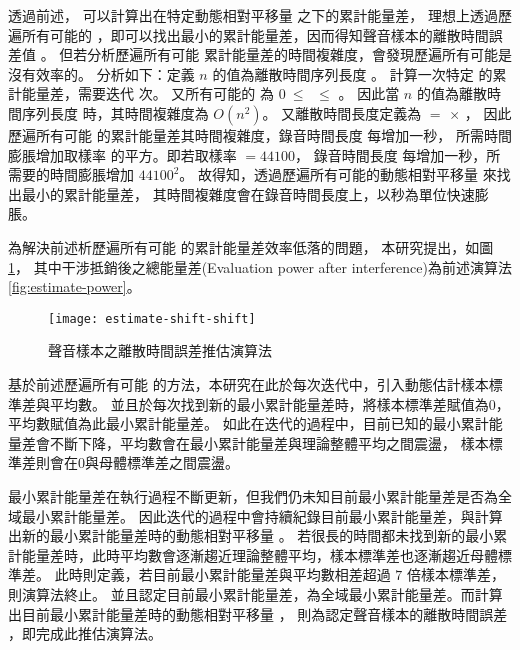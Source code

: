     透過前述，
可以計算出在特定動態相對平移量 \DEFcandiSFT 之下的累計能量差，
理想上透過歷遍所有可能的 \DEFcandiSFT，即可以找出最小的累計能量差，因而得知聲音樣本的離散時間誤差值 \DEFshift。
但若分析歷遍所有可能 \DEFcandiSFT 累計能量差的時間複雜度，會發現歷遍所有可能是沒有效率的。
分析如下：定義 $n$ 的值為離散時間序列長度 \DEFtimeLen。
計算一次特定 \DEFcandiSFT 的累計能量差，需要迭代 \DEFtimeLen 次。
又所有可能的 \DEFcandiSFT 為 $0 ~\leq$ \DEFcandiSFT $~\leq$ \DEFtimeLen。
因此當 $n$ 的值為離散時間序列長度 \DEFtimeLen 時，其時間複雜度為 $O(n^2)$。
又離散時間長度定義為 \DEFtimeLen $=$ \DEFsamplerate $\times$ \DEFtimeREC，
因此歷遍所有可能 \DEFcandiSFT 的累計能量差其時間複雜度，錄音時間長度 \DEFtimeREC 每增加一秒，
所需時間膨脹增加取樣率 \DEFsamplerate 的平方。即若取樣率 \DEFsamplerate $= 44100$，
錄音時間長度 \DEFtimeREC 每增加一秒，所需要的時間膨脹增加 $44100^2$。
故得知，透過歷遍所有可能的動態相對平移量 \DEFcandiSFT 來找出最小的累計能量差，
其時間複雜度會在錄音時間長度上，以秒為單位快速膨脹。

    為解決前述析歷遍所有可能 \DEFcandiSFT 的累計能量差效率低落的問題，
本研究提出，如圖 \ref{fig:estimate-shift}，
其中干涉抵銷後之總能量差(Evaluation power after interference)為前述演算法 \ref{fig:estimate-power}。

\begin{figure}[H]
    \centering
    \texttt{[image: estimate-shift-shift]}
    \caption{聲音樣本之離散時間誤差推估演算法}\label{fig:estimate-shift}
\end{figure}

    基於前述歷遍所有可能 \DEFcandiSFT 的方法，本研究在此於每次迭代中，引入動態估計樣本標準差與平均數。
並且於每次找到新的最小累計能量差時，將樣本標準差賦值為$0$，平均數賦值為此最小累計能量差。
如此在迭代的過程中，目前已知的最小累計能量差會不斷下降，平均數會在最小累計能量差與理論整體平均之間震盪，
樣本標準差則會在$0$與母體標準差之間震盪。

    最小累計能量差在執行過程不斷更新，但我們仍未知目前最小累計能量差是否為全域最小累計能量差。
因此迭代的過程中會持續紀錄目前最小累計能量差，與計算出新的最小累計能量差時的動態相對平移量 \DEFcandiSFT。
若很長的時間都未找到新的最小累計能量差時，此時平均數會逐漸趨近理論整體平均，樣本標準差也逐漸趨近母體標準差。
此時則定義，若目前最小累計能量差與平均數相差超過 $7$ 倍樣本標準差，則演算法終止。
並且認定目前最小累計能量差，為全域最小累計能量差。而計算出目前最小累計能量差時的動態相對平移量 \DEFcandiSFT，
則為認定聲音樣本的離散時間誤差 \DEFshift，即完成此推估演算法。